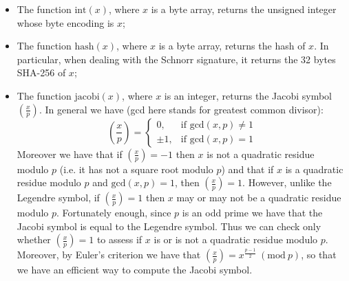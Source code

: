 \begin{itemize}
\begin{itemize}
		\item The function $\text{int}(x)$, where $x$ is a byte array, returns the unsigned integer whose byte encoding is $x$;
		\item The function $\text{hash}(x)$, where $x$ is a byte array, returns the hash of $x$. In particular, when dealing with the Schnorr signature, it returns the 32 bytes SHA-256 of $x$;
		\item The function $\text{jacobi}(x)$, where $x$ is an integer, returns the Jacobi symbol $\left(\frac{x}{p}\right)$. In general we have (gcd here stands for greatest common divisor): $$\left(\frac{x}{p}\right)= \begin{cases} 0, & \text{if gcd}(x, p) \neq 1 \\ \pm 1, & \mbox{if gcd}(x, p) = 1 \end{cases}$$
		Moreover we have that if $\left(\frac{x}{p}\right) = - 1$ then $x$ is not a quadratic residue modulo $p$ (i.e. it has not a square root modulo $p$) and that if $x$ is a quadratic residue modulo $p$ and $\text{gcd}(x, p) = 1$, then $\left(\frac{x}{p}\right) = 1$. However, unlike the Legendre symbol, if $\left(\frac{x}{p}\right) = 1$ then $x$ may or may not be a quadratic residue modulo $p$. Fortunately enough, since $p$ is an odd prime we have that the Jacobi symbol is equal to the Legendre symbol. Thus we can check only whether $\left(\frac{x}{p}\right) = 1$ to assess if $x$ is or is not a quadratic residue modulo $p$.
		\\
		Moreover, by Euler's criterion we have that $\left(\frac{x}{p}\right) = x^{\frac{p - 1}{2}} \ (\text{mod} \ p)$, so that we have an efficient way to compute the Jacobi symbol.
	\end{itemize}	
\end{itemize}

